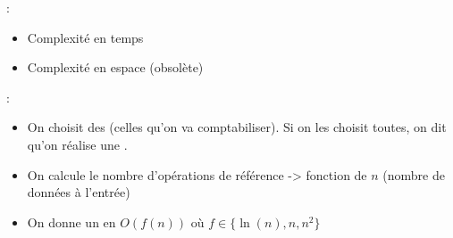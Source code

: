  : \begin{itemize}
	\item Complexité en temps
	\item Complexité en espace (obsolète)
\end{itemize}

 : \begin{itemize}
	\item On choisit des  (celles qu'on va comptabiliser). Si on les choisit toutes, on dit qu'on réalise une .
	\item On calcule le nombre d'opérations de référence -> fonction de $n$ (nombre de données à l'entrée)
	\item On donne un  en $O(f(n))$ où $f \in \{ \ln(n),n,n^2 \}$
\end{itemize}

